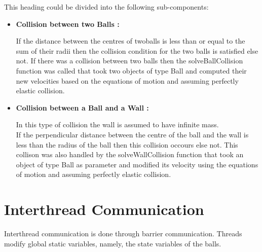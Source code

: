 \documentclass[]{article}
\begin{document}
\begin{flushleft}

This heading could be divided into the following sub-components:

\begin{itemize}


\item \textbf{Collision between two Balls :}\\


\begin{flushleft}

If the distance between the centres of twoballs is less than or equal to the sum of their radii then the collision condition for the two balls is satisfied else not. If there was a collision between two balls then the solveBallCollision function was called that took two objects of type Ball and computed their new velocities based on the equations of motion and assuming perfectly elastic collision.

\end{flushleft}


\item \textbf{Collision between a Ball and a Wall :} \\


\begin{flushleft}

In this type of collision the wall is assumed to have infinite mass.\\

If the perpendicular distance between the centre of the ball and the wall is less than the radius of the ball then this collision occours else not. This collison was also handled by the solveWallCollision function that took an object of type Ball as parameter and modified its velocity using the equations of motion and assuming perfectly elastic collision.

\end{flushleft}  

\end{itemize}

\end{flushleft}


\section{Interthread Communication}

Interthread communication is done through barrier communication. Threads modify global static variables, namely, the state variables of the balls.
\end{document}
